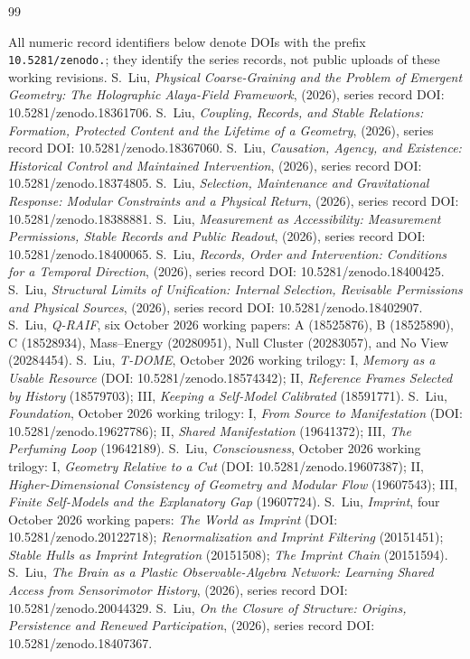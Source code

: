 \documentclass[12pt,a4paper]{article}
\begin{document}
\begin{thebibliography}{99}
\small
\item[] All numeric record identifiers below denote DOIs with the prefix \texttt{10.5281/zenodo.}; they identify the series records, not public uploads of these working revisions.
S.~Liu, \emph{Physical Coarse-Graining and the Problem of Emergent Geometry: The Holographic Alaya-Field Framework}, (2026), series record DOI: 10.5281/zenodo.18361706.
S.~Liu, \emph{Coupling, Records, and Stable Relations: Formation, Protected Content and the Lifetime of a Geometry}, (2026), series record DOI: 10.5281/zenodo.18367060.
S.~Liu, \emph{Causation, Agency, and Existence: Historical Control and Maintained Intervention}, (2026), series record DOI: 10.5281/zenodo.18374805.
S.~Liu, \emph{Selection, Maintenance and Gravitational Response: Modular Constraints and a Physical Return}, (2026), series record DOI: 10.5281/zenodo.18388881.
S.~Liu, \emph{Measurement as Accessibility: Measurement Permissions, Stable Records and Public Readout}, (2026), series record DOI: 10.5281/zenodo.18400065.
S.~Liu, \emph{Records, Order and Intervention: Conditions for a Temporal Direction}, (2026), series record DOI: 10.5281/zenodo.18400425.
S.~Liu, \emph{Structural Limits of Unification: Internal Selection, Revisable Permissions and Physical Sources}, (2026), series record DOI: 10.5281/zenodo.18402907.
S.~Liu, \emph{Q-RAIF}, six October 2026 working papers: A (18525876), B (18525890), C (18528934), Mass--Energy (20280951), Null Cluster (20283057), and No View (20284454).
S.~Liu, \emph{T-DOME}, October 2026 working trilogy: I, \emph{Memory as a Usable Resource} (DOI: 10.5281/zenodo.18574342); II, \emph{Reference Frames Selected by History} (18579703); III, \emph{Keeping a Self-Model Calibrated} (18591771).
S.~Liu, \emph{Foundation}, October 2026 working trilogy: I, \emph{From Source to Manifestation} (DOI: 10.5281/zenodo.19627786); II, \emph{Shared Manifestation} (19641372); III, \emph{The Perfuming Loop} (19642189).
S.~Liu, \emph{Consciousness}, October 2026 working trilogy: I, \emph{Geometry Relative to a Cut} (DOI: 10.5281/zenodo.19607387); II, \emph{Higher-Dimensional Consistency of Geometry and Modular Flow} (19607543); III, \emph{Finite Self-Models and the Explanatory Gap} (19607724).
S.~Liu, \emph{Imprint}, four October 2026 working papers: \emph{The World as Imprint} (DOI: 10.5281/zenodo.20122718); \emph{Renormalization and Imprint Filtering} (20151451); \emph{Stable Hulls as Imprint Integration} (20151508); \emph{The Imprint Chain} (20151594).
S.~Liu, \emph{The Brain as a Plastic Observable-Algebra Network: Learning Shared Access from Sensorimotor History}, (2026), series record DOI: 10.5281/zenodo.20044329.
S.~Liu, \emph{On the Closure of Structure: Origins, Persistence and Renewed Participation}, (2026), series record DOI: 10.5281/zenodo.18407367.
\end{thebibliography}
\end{document}
